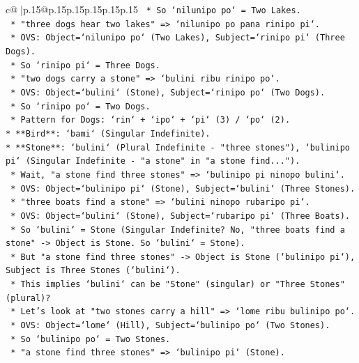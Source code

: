 \documentclass{article}
\begin{document}
{\begin{supertabular}{c@{$\;$}|p{.15\linewidth}@{}p{.15\linewidth}p{.15\linewidth}p{.15\linewidth}p{.15\linewidth}p{.15\linewidth}}
{{{\texttt{        *   So `nilunipo po` = Two Lakes.} \\
\texttt{        *   "three dogs hear two lakes" => `nilunipo po pana rinipo pi`.} \\
\texttt{        *   OVS: Object=`nilunipo po` (Two Lakes), Subject=`rinipo pi` (Three Dogs).} \\
\texttt{        *   So `rinipo pi` = Three Dogs.} \\
\texttt{        *   "two dogs carry a stone" => `bulini ribu rinipo po`.} \\
\texttt{        *   OVS: Object=`bulini` (Stone), Subject=`rinipo po` (Two Dogs).} \\
\texttt{        *   So `rinipo po` = Two Dogs.} \\
\texttt{        *   Pattern for Dogs: `rin` + `ipo` + `pi` (3) / `po` (2).} \\
\texttt{*   **Bird**: `bami` (Singular Indefinite).} \\
\texttt{*   **Stone**: `bulini` (Plural Indefinite {-} "three stones"), `bulinipo pi` (Singular Indefinite {-} "a stone" in "a stone find...").} \\
\texttt{    *   Wait, "a stone find three stones" => `bulinipo pi ninopo bulini`.} \\
\texttt{    *   OVS: Object=`bulinipo pi` (Stone), Subject=`bulini` (Three Stones).} \\
\texttt{    *   "three boats find a stone" => `bulini ninopo rubaripo pi`.} \\
\texttt{    *   OVS: Object=`bulini` (Stone), Subject=`rubaripo pi` (Three Boats).} \\
\texttt{    *   So `bulini` = Stone (Singular Indefinite? No, "three boats find a stone" {-}> Object is Stone. So `bulini` = Stone).} \\
\texttt{    *   But "a stone find three stones" {-}> Object is Stone (`bulinipo pi`), Subject is Three Stones (`bulini`).} \\
\texttt{    *   This implies `bulini` can be "Stone" (singular) or "Three Stones" (plural)?} \\
\texttt{    *   Let's look at "two stones carry a hill" => `lome ribu bulinipo po`.} \\
\texttt{    *   OVS: Object=`lome` (Hill), Subject=`bulinipo po` (Two Stones).} \\
\texttt{    *   So `bulinipo po` = Two Stones.} \\
\texttt{    *   "a stone find three stones" => `bulinipo pi` (Stone).} \\
}}}
\end{supertabular}}
\end{document}
